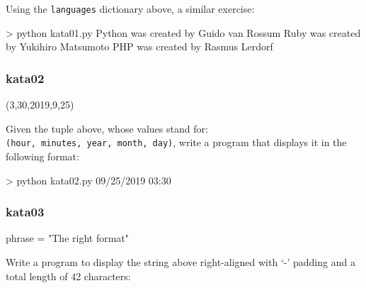 \documentclass[]{article}
\newenvironment{Shaded}{\begin{snugshade}}{\end{snugshade}}
\newcommand{\NormalTok}[1]{\textcolor[rgb]{0.81,0.81,0.76}{#1}}
\begin{document}
Using the \texttt{languages} dictionary above, a similar exercise:

\begin{Shaded}
\begin{Highlighting}[]
\NormalTok{> python kata01.py}
\NormalTok{Python was created by Guido van Rossum}
\NormalTok{Ruby was created by Yukihiro Matsumoto}
\NormalTok{PHP was created by Rasmus Lerdorf}
\end{Highlighting}
\end{Shaded}

\hypertarget{kata02}{%
\subsubsection{kata02}\label{kata02}}

\begin{Shaded}
\begin{Highlighting}[]
\NormalTok{(3,30,2019,9,25)}
\end{Highlighting}
\end{Shaded}

Given the tuple above, whose values stand for:
\texttt{(hour,\ minutes,\ year,\ month,\ day)}, write a program that
displays it in the following format:

\begin{Shaded}
\begin{Highlighting}[]
\NormalTok{> python kata02.py}
\NormalTok{09/25/2019 03:30}
\end{Highlighting}
\end{Shaded}

\hypertarget{kata03}{%
\subsubsection{kata03}\label{kata03}}

\begin{Shaded}
\begin{Highlighting}[]
\NormalTok{phrase = "The right format"}
\end{Highlighting}
\end{Shaded}

Write a program to display the string above right-aligned with `-'
padding and a total length of 42 characters:

\begin{Shaded}
\end{Shaded}
\end{document}
